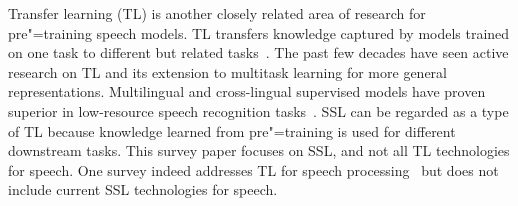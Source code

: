 Transfer learning (TL) is another closely related area of research for
pre"=training speech models. TL transfers knowledge captured by models
trained on one task to different but related tasks~\parencite{caruana_multitask_1997}. 
The past few decades have seen active research on TL and its
extension to multitask learning for more general representations. 
Multilingual and cross-lingual supervised models have proven superior in
low-resource speech recognition tasks~\parencite{cui_multilingual_2015}.
SSL can be regarded as a type of TL because knowledge learned from pre"=training
is used for different downstream tasks.
This survey paper focuses on SSL, and not all TL technologies for speech. 
One survey indeed addresses TL for speech processing~\parencite{bell_adaptation_2021}
but does not include current SSL technologies for speech.  
